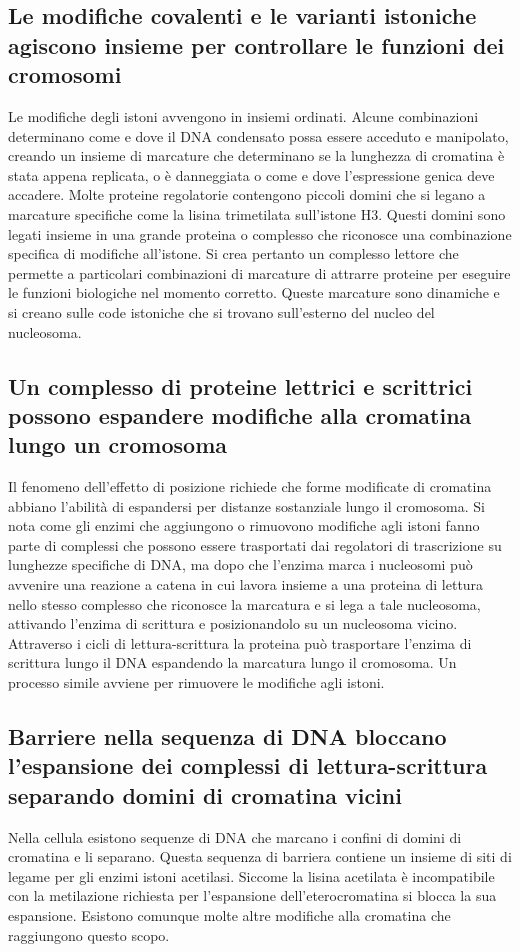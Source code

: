 \subsection{Le modifiche covalenti e le varianti istoniche agiscono insieme per controllare le funzioni dei cromosomi}
Le modifiche degli istoni avvengono in insiemi ordinati. Alcune combinazioni determinano come e dove il DNA condensato possa essere acceduto e manipolato, creando un insieme di marcature
che determinano se la lunghezza di cromatina \`e stata appena replicata, o \`e danneggiata o come e dove l'espressione genica deve accadere. Molte proteine regolatorie contengono piccoli
domini che si legano a marcature specifiche come la lisina trimetilata sull'istone H3. Questi domini sono legati insieme in una grande proteina o complesso che riconosce una combinazione
specifica di modifiche all'istone. Si crea pertanto un complesso lettore che permette a particolari combinazioni di marcature di attrarre proteine per eseguire le funzioni biologiche
nel momento corretto. Queste marcature sono dinamiche e si creano sulle code istoniche che si trovano sull'esterno del nucleo del nucleosoma.
\subsection{Un complesso di proteine lettrici e scrittrici possono espandere modifiche alla cromatina lungo un cromosoma}
Il fenomeno dell'effetto di posizione richiede che forme modificate di cromatina abbiano l'abilit\`a di espandersi per distanze sostanziale lungo il cromosoma. Si nota come gli enzimi 
che aggiungono o rimuovono modifiche agli istoni fanno parte di complessi che possono essere trasportati dai regolatori di trascrizione su lunghezze specifiche di DNA, ma dopo che
l'enzima marca i nucleosomi pu\`o avvenire una reazione a catena in cui lavora insieme a una proteina di lettura nello stesso complesso che riconosce la marcatura e si lega a tale 
nucleosoma, attivando l'enzima di scrittura e posizionandolo su un nucleosoma vicino. Attraverso i cicli di lettura-scrittura la proteina pu\`o trasportare l'enzima di scrittura lungo
il DNA espandendo la marcatura lungo il cromosoma. Un processo simile avviene per rimuovere le modifiche agli istoni. 
\subsection{Barriere nella sequenza di DNA bloccano l'espansione dei complessi di lettura-scrittura separando domini di cromatina vicini}
Nella cellula esistono sequenze di DNA che marcano i confini di domini di cromatina e li separano. Questa sequenza di barriera contiene un insieme di siti di legame per gli enzimi
istoni acetilasi. Siccome la lisina acetilata \`e incompatibile con la metilazione richiesta per l'espansione dell'eterocromatina si blocca la sua espansione. Esistono comunque molte
altre modifiche alla cromatina che raggiungono questo scopo.
